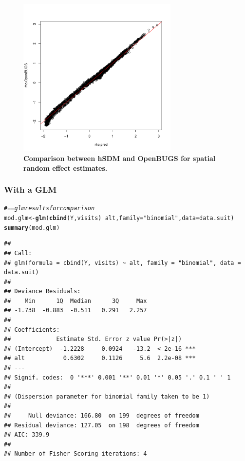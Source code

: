 \documentclass[a4paper, 12pt, leqno]{article}\usepackage[]{graphicx}\usepackage[]{color}
\makeatletter
\newcommand{\hlstr}[1]{\textcolor[rgb]{0.192,0.494,0.8}{#1}}%
\newcommand{\hlcom}[1]{\textcolor[rgb]{0.678,0.584,0.686}{\textit{#1}}}%
\newcommand{\hlopt}[1]{\textcolor[rgb]{0,0,0}{#1}}%
\newcommand{\hlstd}[1]{\textcolor[rgb]{0.345,0.345,0.345}{#1}}%
\newcommand{\hlkwb}[1]{\textcolor[rgb]{0.69,0.353,0.396}{#1}}%
\newcommand{\hlkwc}[1]{\textcolor[rgb]{0.333,0.667,0.333}{#1}}%
\newcommand{\hlkwd}[1]{\textcolor[rgb]{0.737,0.353,0.396}{\textbf{#1}}}%
\newenvironment{kframe}{%
 \def\at@end@of@kframe{}%
 \ifinner\ifhmode%
  \def\at@end@of@kframe{\end{minipage}}%
  \begin{minipage}{\columnwidth}%
 \fi\fi%
 \def\FrameCommand##1{\hskip\@totalleftmargin \hskip-\fboxsep
 \colorbox{shadecolor}{##1}\hskip-\fboxsep
     \hskip-\linewidth \hskip-\@totalleftmargin \hskip\columnwidth}%
 \MakeFramed {\advance\hsize-\width
   \@totalleftmargin\z@ \linewidth\hsize
   \@setminipage}}%
 {\par\unskip\endMakeFramed%
 \at@end@of@kframe}
\newenvironment{knitrout}{}{} %
\makeatother
\begin{document}
\begin{figure}
  \centering \includegraphics[width=8cm]{figures/binom-iCAR-openBUGS.pdf}
  \caption{\textbf{Comparison between hSDM and OpenBUGS for spatial random effect estimates.}}
  \label{fig:binom-iCAR-results}
\end{figure}

\newpage

\subsubsection{With a GLM}

\begin{knitrout}\small
{}\color{fgcolor}\begin{kframe}
\begin{alltt}
\hlcom{#== glm results for comparison}
\hlstd{mod.glm} \hlkwb{<-} \hlkwd{glm}\hlstd{(}\hlkwd{cbind}\hlstd{(Y,visits)}\hlopt{~}\hlstd{alt,}\hlkwc{family}\hlstd{=}\hlstr{"binomial"}\hlstd{,}\hlkwc{data}\hlstd{=data.suit)}
\hlkwd{summary}\hlstd{(mod.glm)}
\end{alltt}
\begin{verbatim}
## 
## Call:
## glm(formula = cbind(Y, visits) ~ alt, family = "binomial", data = data.suit)
## 
## Deviance Residuals: 
##    Min      1Q  Median      3Q     Max  
## -1.738  -0.883  -0.511   0.291   2.257  
## 
## Coefficients:
##             Estimate Std. Error z value Pr(>|z|)    
## (Intercept)  -1.2228     0.0924   -13.2  < 2e-16 ***
## alt           0.6302     0.1126     5.6  2.2e-08 ***
## ---
## Signif. codes:  0 '***' 0.001 '**' 0.01 '*' 0.05 '.' 0.1 ' ' 1
## 
## (Dispersion parameter for binomial family taken to be 1)
## 
##     Null deviance: 166.80  on 199  degrees of freedom
## Residual deviance: 127.05  on 198  degrees of freedom
## AIC: 339.9
## 
## Number of Fisher Scoring iterations: 4
\end{verbatim}
\end{kframe}
\end{knitrout}
\end{document}
